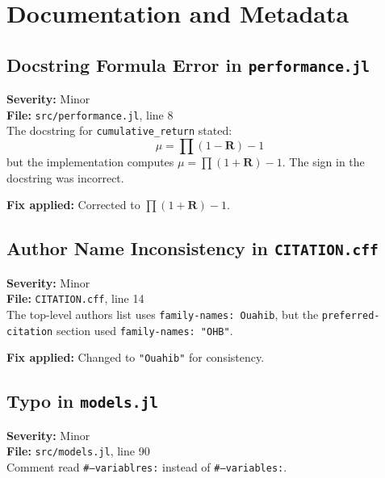 \documentclass[11pt,a4paper]{article}
\begin{document}
\section{Documentation and Metadata}

\subsection{Docstring Formula Error in \texttt{performance.jl}}
\label{sec:formula}

\textbf{Severity:} Minor\\
\textbf{File:} \texttt{src/performance.jl}, line 8\\[0.3em]
The docstring for \texttt{cumulative\_return} stated:
\[
  \mu = \prod(1 - \mathbf{R}) - 1
\]
but the implementation computes $\mu = \prod(1 + \mathbf{R}) - 1$. The sign in
the docstring was incorrect.

\textbf{Fix applied:} Corrected to $\prod(1 + \mathbf{R}) - 1$.

\subsection{Author Name Inconsistency in \texttt{CITATION.cff}}
\label{sec:citation}

\textbf{Severity:} Minor\\
\textbf{File:} \texttt{CITATION.cff}, line 14\\[0.3em]
The top-level authors list uses \texttt{family-names: Ouahib}, but the
\texttt{preferred-citation} section used \texttt{family-names: "OHB"}.

\textbf{Fix applied:} Changed to \texttt{"Ouahib"} for consistency.

\subsection{Typo in \texttt{models.jl}}
\label{sec:typo-models}

\textbf{Severity:} Minor\\
\textbf{File:} \texttt{src/models.jl}, line 90\\[0.3em]
Comment read \texttt{\#---variablres:} instead of \texttt{\#---variables:}.
\end{document}
